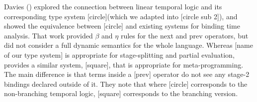 Davies (\cite{davies96}) explored the connection between linear temporal logic and its corresponding type system [circle](which we adapted into [circle sub 2]), and showed the equivalence between [circle] and existing systems for binding time analysis. That work provided $\beta$ and $\eta$ rules for the next and prev operators, but did not consider a full dynamic semantics for the whole language. Whereas [name of our type system] is appropriate for stage-splitting and partial evaluation, \cite{davies01} provides a similar system, [square], that is appropriate for meta-programming.  The main difference is that terms inside a [prev] operator do not see any stage-2 bindings declared outside of it.  They note that where [circle] corresponds to the non-branching temporal logic, [square] corresponds to the branching version.
